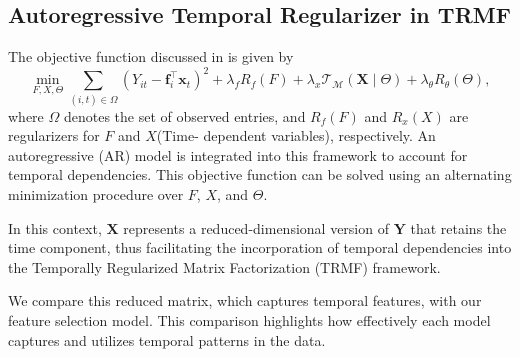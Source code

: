 \documentclass[twoside,11pt]{article}
\begin{document}
\subsection{Autoregressive Temporal Regularizer in TRMF}

The objective function discussed in \cite{author2024} is given by \begin{equation}
  \min_{F, X, \Theta} \sum_{(i,t) \in \Omega} \left(Y_{it} - \mathbf{f}_i^{\top} \mathbf{x}_t\right)^2 + \lambda_f R_f(F) + \lambda_x \mathcal{T}_{\mathcal{M}}(\mathbf{X} \mid \Theta) + \lambda_{\theta} R_{\theta}(\Theta),
\end{equation} where $\Omega$ denotes the set of observed entries, and $R_f(F)$ and $R_x(X)$ are regularizers for $F$ and $X$(Time- dependent variables), respectively. An autoregressive (AR) model is integrated into this framework to account for temporal dependencies. This objective function can be solved using an alternating minimization procedure over $F$, $X$, and $\Theta$.

In this context, $\mathbf{X}$ represents a reduced-dimensional version of $\mathbf{Y}$ that retains the time component, thus facilitating the incorporation of temporal dependencies into the Temporally Regularized Matrix Factorization (TRMF) framework.

We compare this reduced matrix, which captures temporal features, with our feature selection model. This comparison highlights how effectively each model captures and utilizes temporal patterns in the data.
\end{document}
